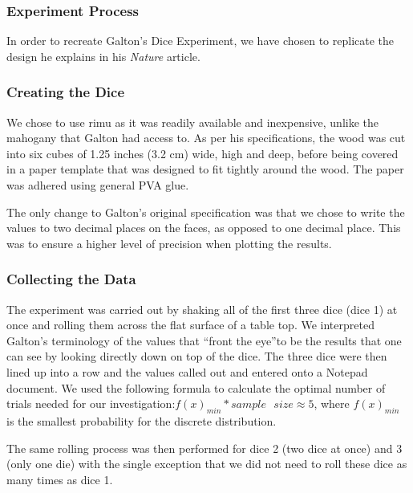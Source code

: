 \subsubsection*{Experiment Process}
In order to recreate Galton's Dice Experiment, we have chosen to replicate the design he explains in his \textit{Nature} article. 

\subsubsection*{Creating the Dice}
We chose to use rimu as it was readily available and inexpensive, unlike the mahogany that Galton had access to. As per his specifications, the wood was cut into six cubes of 1.25 inches (3.2 cm) wide, high and deep, before being covered in a paper template that was designed to fit tightly around the wood. The paper was adhered using general PVA glue. 

The only change to Galton's original specification was that we chose to write the values to two decimal places on the faces, as opposed to one decimal place. This was to ensure a higher level of precision when plotting the results. 

\subsubsection*{Collecting the Data}
The experiment was carried out by shaking all of the first three dice (dice 1) at once and rolling them across the flat surface of a table top. We interpreted Galton's terminology of the values that \textquotedblleft front the eye\textquotedblright to be the results that one can see by looking directly down on top of the dice. The three dice were then lined up into a row and the values called out and entered onto a Notepad document. We used the following formula to calculate the optimal number of trials needed for our investigation:$f(x)_{min}*sample\textrm{ }size\approx 5 $, where $f(x)_{min}$ is the smallest probability for the discrete distribution. 

The same rolling process was then performed for dice 2 (two dice at once) and 3 (only one die) with the single exception that we did not need to roll these dice as many times as dice 1. 


 
